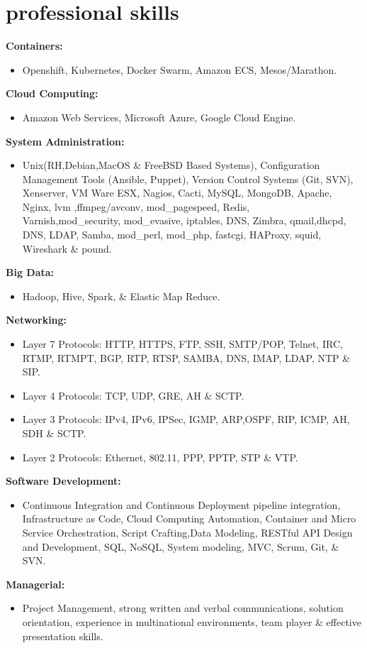 \documentclass[]{friggeri-cv} %
\begin{document}
\section{professional skills}
{\large \textbf{Containers:}}
\begin{itemize}
\item Openshift, Kubernetes, Docker Swarm, Amazon ECS, Mesos/Marathon.    
\end{itemize}
{\large \textbf{Cloud Computing:}}
\begin{itemize}
\item Amazon Web Services, Microsoft Azure, Google Cloud Engine.   
\end{itemize}
{\large \textbf{System Administration:}}
\begin{itemize}
\item Unix(RH,Debian,MacOS \& FreeBSD Based Systems), Configuration Management Tools (Ansible, Puppet), Version Control Systems (Git, SVN), Xenserver, VM Ware ESX, Nagios, Cacti, MySQL, MongoDB, Apache, Nginx, lvm ,ffmpeg/avconv, mod\_pagespeed, Redis, \\ 
Varnish,mod\_security, mod\_evasive, iptables, DNS, Zimbra, qmail,dhcpd, DNS, LDAP, Samba, mod\_perl, mod\_php, fastcgi, HAProxy, squid, Wireshark \& pound.  
\end{itemize}
{\large \textbf{Big Data:}}
\begin{itemize}
\item Hadoop, Hive, Spark, \& Elastic Map Reduce.   
\end{itemize}
{\large \textbf{Networking:}}
\begin{itemize}
\item Layer 7 Protocols: HTTP, HTTPS, FTP, SSH, SMTP/POP, Telnet, IRC, RTMP, RTMPT, BGP, RTP, RTSP, SAMBA, DNS, IMAP, LDAP, NTP \& SIP. 
\item Layer 4 Protocols: TCP, UDP, GRE, AH \& SCTP.
\item Layer 3 Protocols: IPv4, IPv6, IPSec, IGMP, ARP,OSPF, RIP, ICMP, AH, SDH \& SCTP.
\item Layer 2 Protocols: Ethernet, 802.11, PPP, PPTP, STP \& VTP.
\end{itemize}
{\large \textbf{Software Development:}}
\begin{itemize}
\item Continuous Integration and Continuous Deployment pipeline integration, Infrastructure as Code, Cloud Computing Automation, Container and Micro Service Orchestration, Script Crafting,Data Modeling, RESTful API Design and Development, SQL, NoSQL, System modeling, MVC, Scrum, Git, \& SVN.
\end{itemize}
{\large \textbf{Managerial:}}
\begin{itemize}
\item Project Management, strong written and verbal communications, solution orientation, experience in multinational environments, team player  \& effective presentation skills. 
\end{itemize}
\end{document}
